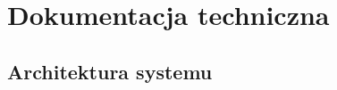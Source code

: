 \documentclass[12pt]{article}
\begin{document}
			
				
				
				
				
				 

		
	\section{Dokumentacja techniczna}
	
		\subsection{Architektura systemu}
		
\end{document}
